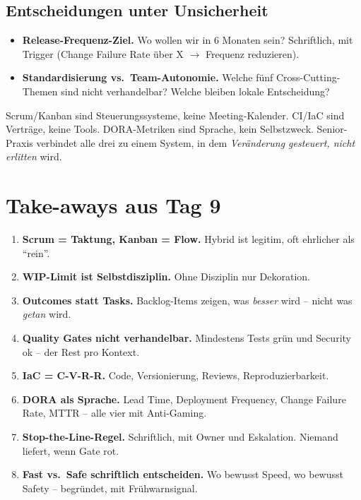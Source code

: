 \documentclass[11pt,a4paper,oneside]{article}
\begin{document}
\subsection{Entscheidungen unter Unsicherheit}

\begin{itemize}
  \item \textbf{Release-Frequenz-Ziel.} Wo wollen wir in 6 Monaten sein? Schriftlich, mit Trigger (Change Failure Rate über X $\rightarrow$ Frequenz reduzieren).
  \item \textbf{Standardisierung vs.\ Team-Autonomie.} Welche fünf Cross-Cutting-Themen sind nicht verhandelbar? Welche bleiben lokale Entscheidung?
\end{itemize}

\begin{merkbox}
Scrum/Kanban sind Steuerungssysteme, keine Meeting-Kalender. CI/IaC sind Verträge, keine Tools. DORA-Metriken sind Sprache, kein Selbstzweck. Senior-Praxis verbindet alle drei zu einem System, in dem \emph{Veränderung gesteuert, nicht erlitten} wird.
\end{merkbox}

\section{Take-aways aus Tag 9}

\begin{enumerate}
  \item \textbf{Scrum = Taktung, Kanban = Flow.} Hybrid ist legitim, oft ehrlicher als ``rein''.
  \item \textbf{WIP-Limit ist Selbstdisziplin.} Ohne Disziplin nur Dekoration.
  \item \textbf{Outcomes statt Tasks.} Backlog-Items zeigen, was \emph{besser} wird -- nicht was \emph{getan} wird.
  \item \textbf{Quality Gates nicht verhandelbar.} Mindestens Tests grün und Security ok -- der Rest pro Kontext.
  \item \textbf{IaC = C-V-R-R.} Code, Versionierung, Reviews, Reproduzierbarkeit.
  \item \textbf{DORA als Sprache.} Lead Time, Deployment Frequency, Change Failure Rate, MTTR -- alle vier mit Anti-Gaming.
  \item \textbf{Stop-the-Line-Regel.} Schriftlich, mit Owner und Eskalation. Niemand liefert, wenn Gate rot.
  \item \textbf{Fast vs.\ Safe schriftlich entscheiden.} Wo bewusst Speed, wo bewusst Safety -- begründet, mit Frühwarnsignal.
\end{enumerate}
\end{document}
